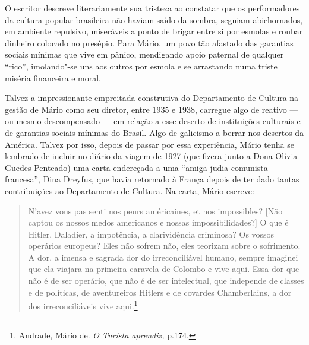 O escritor descreve literariamente sua tristeza ao constatar que os performadores da cultura
popular brasileira não haviam saído da sombra, seguiam abichornados, em
ambiente repulsivo, miseráveis a ponto de brigar entre si por esmolas e
roubar dinheiro colocado no presépio. Para Mário, um povo tão afastado
das garantias sociais mínimas que vive em pânico, mendigando apoio
paternal de qualquer ``rico'', imolando"-se uns aos outros por esmola e
se arrastando numa triste miséria financeira e moral.

Talvez a impressionante empreitada construtiva do Departamento de
Cultura na gestão de Mário como seu diretor, entre 1935 e 1938, carregue
algo de reativo --- ou mesmo descompensado --- em relação a esse deserto
de instituições culturais e de garantias sociais mínimas do Brasil. Algo
de galicismo a berrar nos desertos da América. Talvez por isso, depois
de passar por essa experiência, Mário tenha se lembrado de incluir no
diário da viagem de 1927 (que fizera junto a Dona Olívia Guedes
Penteado) uma carta endereçada a uma ``amiga judia comunista francesa'',
Dina Dreyfus, que havia retornado à França depois de ter dado tantas
contribuições ao Departamento de Cultura. Na carta, Mário escreve:

\begin{quote}
N'avez vous pas senti nos peurs américaines, et nos impossibles? {[}Não
captou os nossos medos americanos e nossas impossibilidades?{]} O que é
Hitler, Daladier, a impotência, a clarividência criminosa? Os vossos
operários europeus? Eles não sofrem não, eles teorizam sobre o
sofrimento. A dor, a imensa e sagrada dor do irreconciliável humano,
sempre imaginei que ela viajara na primeira caravela de Colombo e vive
aqui. Essa dor que não é de ser operário, que não é de ser intelectual,
que independe de classes e de políticas, de aventureiros Hitlers e de
covardes Chamberlains, a dor dos irreconciliáveis vive aqui.\footnote{Andrade,
  Mário de. \emph{O Turista aprendiz,} p.174.}
\end{quote}

